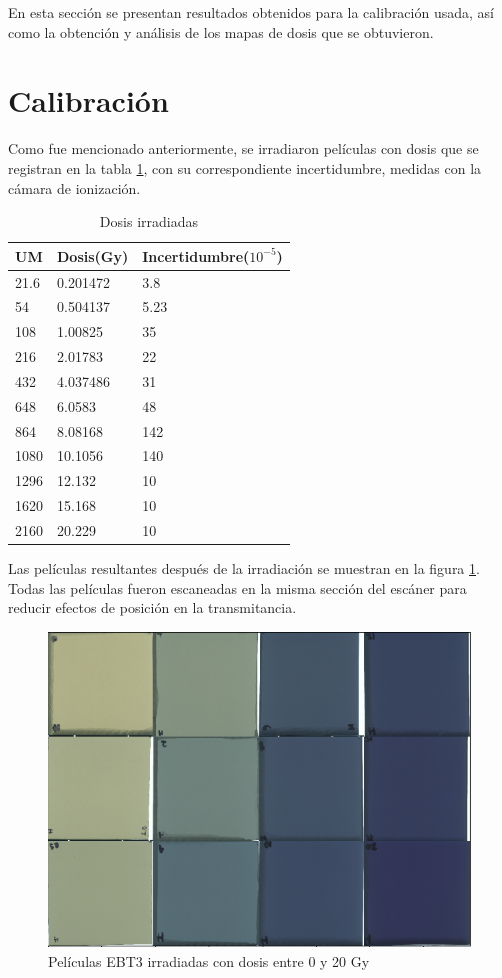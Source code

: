 En esta sección se presentan resultados obtenidos para la calibración usada, así como la obtención y análisis de los mapas de dosis que se obtuvieron.
\section{Calibración}
Como fue mencionado anteriormente, se irradiaron películas con dosis que se registran en la tabla \ref{tab:DosisIrra}, con su correspondiente incertidumbre, medidas con la cámara de ionización.\\

\begin{table}[]
	\centering
	\begin{tabular}{|l|l|l|}
		\hline
		UM& Dosis(Gy)    & Incertidumbre($10^{-5}$) \\ \hline
		21.6&0.201472 & 3.8\\ \hline
		54&0.504137 & 5.23 \\ \hline
		108&1.00825  & 35\\ \hline
		216&2.01783  & 22\\ \hline
		432&4.037486 & 31 \\ \hline
		648&6.0583   & 48\\ \hline
		864&8.08168  & 142\\ \hline
		1080&10.1056  & 140\\ \hline
		1296&12.132   & 10\\ \hline
		1620&15.168   & 10\\ \hline
		2160&20.229   & 10\\ \hline
	\end{tabular}
	\caption{Dosis irradiadas}
	\label{tab:DosisIrra}
\end{table}

Las películas resultantes después de la irradiación se muestran en la figura \ref{fig:peliculasIrradiacion}. Todas las películas fueron escaneadas en la misma sección del escáner para reducir efectos de posición en la transmitancia.\\
\begin{figure}[H]
	\centering
	\includegraphics[width=0.7\linewidth]{images/peliculasIrradiadas.png}
	\caption{Películas EBT3 irradiadas con dosis entre 0 y 20 Gy }
	\label{fig:peliculasIrradiacion}
\end{figure}

